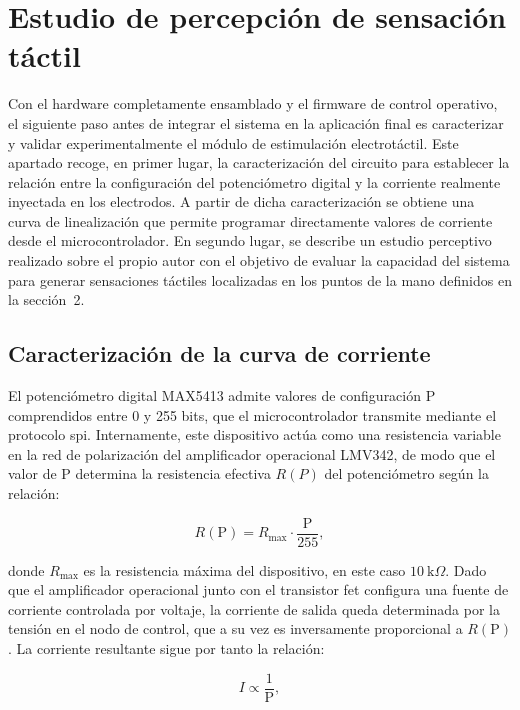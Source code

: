 \documentclass[12pt]{article}
\begin{document}
\section{Estudio de percepción de sensación táctil}

Con el hardware completamente ensamblado y el firmware de control operativo, el siguiente paso antes de integrar el sistema en la aplicación final es caracterizar y validar experimentalmente el módulo de estimulación electrotáctil. Este apartado recoge, en primer lugar, la caracterización del circuito para establecer la relación entre la configuración del potenciómetro digital y la corriente realmente inyectada en los electrodos. A partir de dicha caracterización se obtiene una curva de linealización que permite programar directamente valores de corriente desde el microcontrolador. En segundo lugar, se describe un estudio perceptivo realizado sobre el propio autor con el objetivo de evaluar la capacidad del sistema para generar sensaciones táctiles localizadas en los puntos de la mano definidos en la sección~2.

\subsection{Caracterización de la curva de corriente}

El potenciómetro digital MAX5413 admite valores de configuración $\mathrm{P}$ comprendidos entre 0 y 255 bits, que el microcontrolador transmite mediante el protocolo \gls{spi}. Internamente, este dispositivo actúa como una resistencia variable en la red de polarización del amplificador operacional LMV342, de modo que el valor de $\mathrm{P}$ determina la resistencia efectiva $R(P)$ del potenciómetro según la relación:

\begin{equation}
    R(\mathrm{P}) = R_{\max} \cdot \frac{\mathrm{P}}{255},
\end{equation}

donde $R_{\max}$ es la resistencia máxima del dispositivo, en este caso $10~\mathrm{k}\Omega$. Dado que el amplificador operacional junto con el transistor \gls{fet} configura una fuente de corriente controlada por voltaje, la corriente de salida queda determinada por la tensión en el nodo de control, que a su vez es inversamente proporcional a $R(\mathrm{P})$. La corriente resultante sigue por tanto la relación:

\begin{equation}
    I \propto \frac{1}{\mathrm{P}},
    \label{eq:curva_corriente}
\end{equation}
\end{document}
